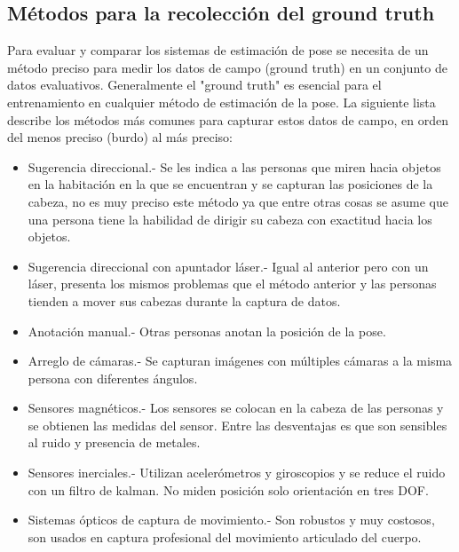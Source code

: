    \subsection{Métodos para la recolección del ground truth}
   Para evaluar y comparar los sistemas de estimación de pose se necesita de un método preciso para medir los datos de campo (ground truth) en un conjunto de datos evaluativos. Generalmente el "ground truth" es esencial para el entrenamiento en cualquier método de estimación de la pose. La siguiente lista describe los métodos más comunes para capturar estos datos de campo, en orden del menos preciso (burdo) al más preciso:
   \begin{itemize}
   	\item Sugerencia direccional.- Se les indica a las personas que miren hacia objetos en la habitación en la que se encuentran y se capturan las posiciones de la cabeza, no es muy preciso este método ya que entre otras cosas se asume que una persona tiene la habilidad de dirigir su cabeza con exactitud hacia los objetos.
   	\item Sugerencia direccional con apuntador láser.- Igual al anterior pero con un láser, presenta los mismos problemas que el método anterior y las personas tienden a mover sus cabezas durante la captura de datos.
   	\item Anotación manual.- Otras personas anotan la posición de la pose.
   	\item Arreglo de cámaras.- Se capturan imágenes con múltiples cámaras a la misma persona con diferentes ángulos.
   	\item Sensores magnéticos.- Los sensores se colocan en la cabeza de las personas y se obtienen las medidas del sensor. Entre las desventajas es que son sensibles al ruido y presencia de metales.
   	\item Sensores inerciales.- Utilizan acelerómetros y giroscopios y se reduce el ruido con un filtro de kalman. No miden posición solo orientación en tres DOF.
   	\item Sistemas ópticos de captura de movimiento.- Son robustos y muy costosos, son usados en captura profesional del movimiento articulado del cuerpo.	
   \end{itemize}
   
